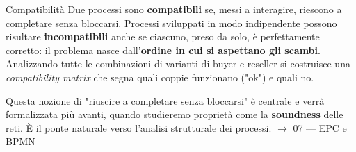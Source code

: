 \begin{boxwarning}{Compatibilità}
Due processi sono \textbf{compatibili} se, messi a interagire, riescono a completare senza bloccarsi. Processi sviluppati in modo indipendente possono risultare \textbf{incompatibili} anche se ciascuno, preso da solo, è perfettamente corretto: il problema nasce dall'\textbf{ordine in cui si aspettano gli scambi}. Analizzando tutte le combinazioni di varianti di buyer e reseller si costruisce una \emph{compatibility matrix} che segna quali coppie funzionano ("ok") e quali no.
\end{boxwarning}

Questa nozione di "riuscire a completare senza bloccarsi" è centrale e verrà formalizzata più avanti, quando studieremo proprietà come la \textbf{soundness} delle reti. È il ponte naturale verso l'analisi strutturale dei processi. $\rightarrow$ \hyperref[ch:07a]{07 — EPC e BPMN}